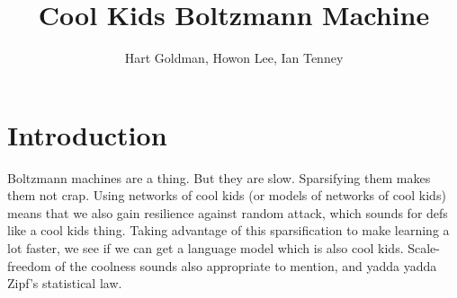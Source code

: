 \documentclass[12pt]{article}
\begin{document}
\title{Cool Kids Boltzmann Machine}
\author{Hart Goldman, Howon Lee, Ian Tenney}
\maketitle

\section{Introduction}
Boltzmann machines are a thing. But they are slow. Sparsifying them makes them not crap. Using networks of cool kids (or models of networks of cool kids) means that we also gain resilience against random attack, which sounds for defs like a cool kids thing. Taking advantage of this sparsification to make learning a lot faster, we see if we can get a language model which is also cool kids. Scale-freedom of the coolness sounds also appropriate to mention, and yadda yadda Zipf's statistical law.
\end{document}

